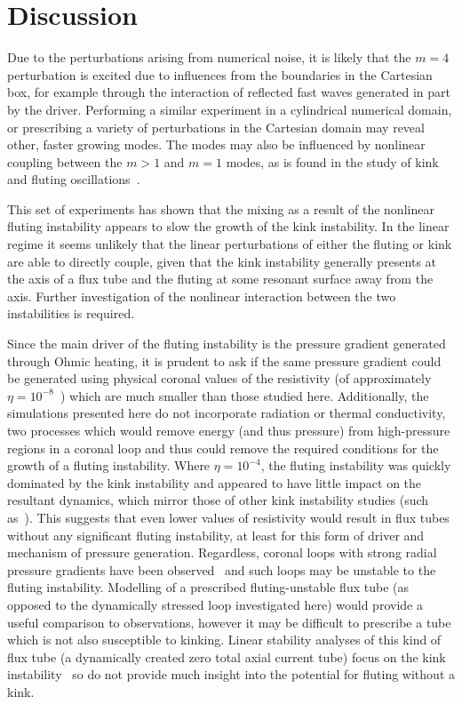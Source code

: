 \documentclass[12pt]{article}
\begin{document}
\section{Discussion}

Due to the perturbations arising from numerical noise, it is likely that the $m=4$ perturbation is excited due to influences from the boundaries in the Cartesian box, for example through the interaction of reflected fast waves generated in part by the driver. Performing a similar experiment in a cylindrical numerical domain, or prescribing a variety of perturbations in the Cartesian domain may reveal other, faster growing modes. The modes may also be influenced by nonlinear coupling between the $m>1$ and $m=1$ modes, as is found in the study of kink and fluting oscillations~\cite{terradasEffectMagneticTwist2018,rudermanNonlinearGenerationFluting2017a}.

This set of experiments has shown that the mixing as a result of the nonlinear fluting instability appears to slow the growth of the kink instability. In the linear regime it seems unlikely that the linear perturbations of either the fluting or kink are able to directly couple, given that the kink instability generally presents at the axis of a flux tube and the fluting at some resonant surface away from the axis. Further investigation of the nonlinear interaction between the two instabilities is required.

Since the main driver of the fluting instability is the pressure gradient generated through Ohmic heating, it is prudent to ask if the same pressure gradient could be generated using physical coronal values of the resistivity (of approximately $\eta=10^{-8}$~\cite{craigAnisotropicViscousDissipation2009a}) which are much smaller than those studied here. Additionally, the simulations presented here do not incorporate radiation or thermal conductivity, two processes which would remove energy (and thus pressure) from high-pressure regions in a coronal loop and thus could remove the required conditions for the growth of a fluting instability. Where $\eta=10^{-4}$, the fluting instability was quickly dominated by the kink instability and appeared to have little impact on the resultant dynamics, which mirror those of other kink instability studies (such as~\cite{hoodCoronalHeatingMagnetic2009}). This suggests that even lower values of resistivity would result in flux tubes without any significant fluting instability, at least for this form of driver and mechanism of pressure generation. Regardless, coronal loops with strong radial pressure gradients have been observed~\cite{foukalTemperatureStructurePressure1975} and such loops may be unstable to the fluting instability. Modelling of a prescribed fluting-unstable flux tube (as opposed to the dynamically stressed loop investigated here) would provide a useful comparison to observations, however it may be difficult to prescribe a tube which is not also susceptible to kinking. Linear stability analyses of this kind of flux tube (a dynamically created zero total axial current tube) focus on the kink instability~\cite{browningSolarCoronalHeating2003c} so do not provide much insight into the potential for fluting without a kink.
\end{document}
